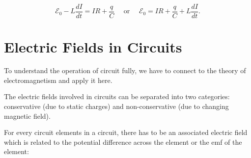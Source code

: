 \documentclass[english,a4paper,12pt]{report}
\begin{document}
\begin{equation}
    \mathcal{E}_{0} - L\frac{dI}{dt} = IR + \frac{q}{C} \text {  ~~ or  ~~ } \mathcal{E}_{0} = IR + \frac{q}{C} + L\frac{dI}{dt} .  
\end{equation}

\section{Electric Fields in Circuits}

To understand the operation of circuit fully, we have to connect to the theory of electromagnetism and apply it here. 

The electric fields involved in circuits can be separated into two categories: conservative (due to static charges) and non-conservative (due to changing magnetic field).

For every circuit elements in a circuit, there has to be an associated electric field which is related to the potential difference across the element or the emf of the element:
\end{document}
